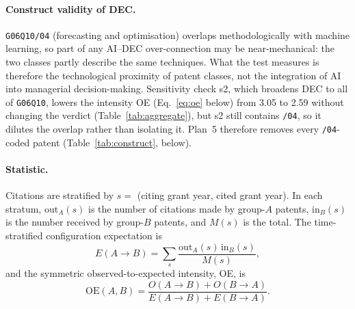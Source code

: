 \paragraph{Construct validity of DEC.} \texttt{G06Q10/04} (forecasting and optimisation) overlaps methodologically with machine learning, so part of any AI--DEC over-connection may be near-mechanical: the two classes partly describe the same techniques. What the test measures is therefore the technological proximity of patent classes, not the integration of AI into managerial decision-making. Sensitivity check s2, which broadens DEC to all of \texttt{G06Q10}, lowers the intensity OE (Eq.~\eqref{eq:oe} below) from 3.05 to 2.59 without changing the verdict (Table~\ref{tab:aggregate}), but s2 still contains \texttt{/04}, so it dilutes the overlap rather than isolating it. Plan~5 therefore removes every \texttt{/04}-coded patent (Table~\ref{tab:construct}, below).

\paragraph{Statistic.} Citations are stratified by $s = $ (citing grant year, cited grant year). In each stratum, $\mathrm{out}_A(s)$ is the number of citations made by group-$A$ patents, $\mathrm{in}_B(s)$ is the number received by group-$B$ patents, and $M(s)$ is the total. The time-stratified configuration expectation is
\begin{equation}
E(A\!\rightarrow\!B) = \sum_{s} \frac{\mathrm{out}_A(s)\,\mathrm{in}_B(s)}{M(s)} ,
\label{eq:patent_expected}
\end{equation}
and the symmetric observed-to-expected intensity, OE, is
\begin{equation}
\mathrm{OE}(A,B) = \frac{O(A\!\rightarrow\!B) + O(B\!\rightarrow\!A)}{E(A\!\rightarrow\!B) + E(B\!\rightarrow\!A)} .
\label{eq:oe}
\end{equation}

